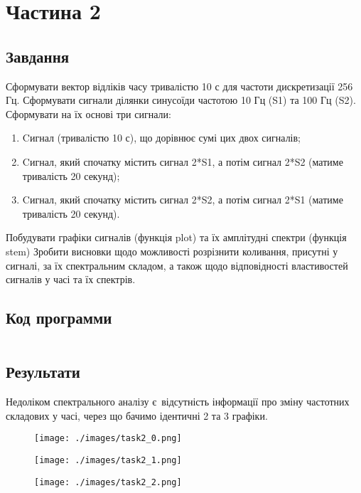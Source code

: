 \section{Частина 2}
\label{sec:task2}

\subsection{Завдання}
\label{subsec:task2_task}

Сформувати вектор відліків часу тривалістю 10 с для частоти
дискретизації 256 Гц. Сформувати сигнали ділянки синусоїди частотою 10 Гц
(S1) та 100 Гц (S2). Сформувати на їх основі три сигнали:
\begin{enumerate}
    \item Cигнал (тривалістю 10 с), що дорівнює сумі цих двох сигналів;
    \item Cигнал, який спочатку містить сигнал 2*S1, а потім сигнал 2*S2
          (матиме тривалість 20 секунд);
    \item Cигнал, який спочатку містить сигнал 2*S2, а потім сигнал 2*S1
          (матиме тривалість 20 секунд).
\end{enumerate}
Побудувати графіки сигналів (функція plot) та їх амплітудні
спектри (функція stem) Зробити висновки щодо можливості
розрізнити коливання, присутні у сигналі, за їх спектральним складом, а також
щодо відповідності властивостей сигналів у часі та їх спектрів.

\subsection{Код программи}
\label{subsec:task2_code}
\inputminted{python}{../src/task2.py}

\subsection{Результати}
\label{subsec:task2_results}

Недоліком спектрального аналізу є відсутність інформації про зміну
частотних складових у часі, через що бачимо ідентичні 2 та 3 графіки.

\begin{figure}[!ht]
    \centering
    \texttt{[image: ./images/task2\_0.png]}
\end{figure}

\begin{figure}[!ht]
    \centering
    \texttt{[image: ./images/task2\_1.png]}
\end{figure}

\begin{figure}[!ht]
    \centering
    \texttt{[image: ./images/task2\_2.png]}
\end{figure}

